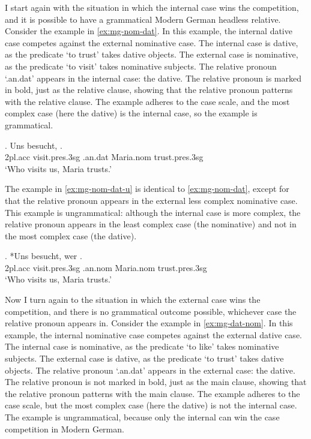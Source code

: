 I start again with the situation in which the internal case wins the competition, and it is possible to have a grammatical Modern German headless relative.
Consider the example in \ref{ex:mg-nom-dat}. In this example, the internal dative case competes against the external nominative case.
The internal case is dative, as the predicate  `to trust' takes dative objects.
The external case is nominative, as the predicate  `to visit' takes nominative subjects.
The relative pronoun  `.\ac{an}.\ac{dat}' appears in the internal case: the dative. The relative pronoun is marked in bold, just as the relative clause, showing that the relative pronoun patterns with the relative clause.
The example adheres to the case scale, and the most complex case (here the dative) is the internal case, so the example is grammatical.

\exg. Uns besucht,   .\\
2\ac{pl}.\ac{acc} visit.\ac{pres}.3\ac{sg}\scsub{[nom]} .\ac{an}.\ac{dat} Maria.\ac{nom} trust.\ac{pres}.3\ac{sg}\scsub{[dat]}\\
`Who visits us, Maria trusts.' \label{ex:mg-nom-dat}

The example in \ref{ex:mg-nom-dat-u} is identical to \ref{ex:mg-nom-dat}, except for that the relative pronoun appears in the external less complex nominative case. This example is ungrammatical: although the internal case is more complex, the relative pronoun appears in the least complex case (the nominative) and not in the most complex case (the dative).

\exg. *Uns besucht, wer  .\\
2\ac{pl}.\ac{acc} visit.\ac{pres}.3\ac{sg}\scsub{[nom]} .\ac{an}.\ac{nom} Maria.\ac{nom} trust.\ac{pres}.3\ac{sg}\scsub{[dat]}\\
`Who visits us, Maria trusts.' \label{ex:mg-nom-dat-u}

Now I turn again to the situation in which the external case wins the competition, and there is no grammatical outcome possible, whichever case the relative pronoun appears in.
Consider the example in \ref{ex:mg-dat-nom}. In this example, the internal nominative case competes against the external dative case.
The internal case is nominative, as the predicate  `to like' takes nominative subjects.
The external case is dative, as the predicate  `to trust' takes dative objects.
The relative pronoun  `.\ac{an}.\ac{dat}' appears in the external case: the dative. The relative pronoun is not marked in bold, just as the main clause, showing that the relative pronoun patterns with the main clause.
The example adheres to the case scale, but the most complex case (here the dative) is not the internal case. The example is ungrammatical, because only the internal can win the case competition in Modern German.

